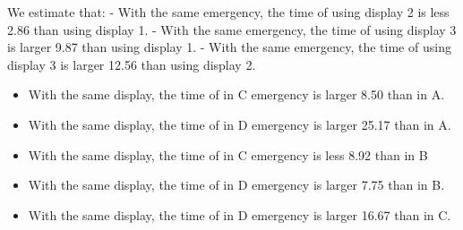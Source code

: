 \documentclass[
]{article}
\providecommand{\tightlist}{%
  \setlength{\itemsep}{0pt}\setlength{\parskip}{0pt}}
\begin{document}
We estimate that: - With the same emergency, the time of using display 2
is less 2.86 than using display 1. - With the same emergency, the time
of using display 3 is larger 9.87 than using display 1. - With the same
emergency, the time of using display 3 is larger 12.56 than using
display 2.

\begin{itemize}
\tightlist
\item
  With the same display, the time of in C emergency is larger 8.50 than
  in A.
\item
  With the same display, the time of in D emergency is larger 25.17 than
  in A.
\item
  With the same display, the time of in C emergency is less 8.92 than in
  B
\item
  With the same display, the time of in D emergency is larger 7.75 than
  in B.
\item
  With the same display, the time of in D emergency is larger 16.67 than
  in C.
\end{itemize}
\end{document}
